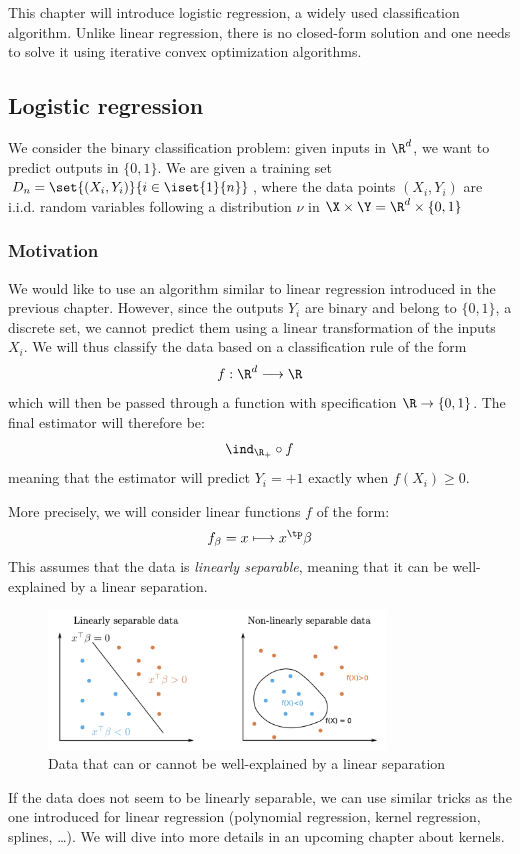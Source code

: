 \documentclass[toc, titlepaged]{../cs-classes/cs-classes}
\begin{document}
This chapter will introduce logistic regression, a widely used classification algorithm. Unlike linear regression, there is no closed-form solution and one needs to solve it using iterative convex optimization algorithms.

\subsection{Logistic regression}
We consider the binary classification problem: given inputs in $\R^d$, we want to predict outputs in $\{0, 1\}$. We are given a training set $D_n=\set{(X_i, Y_i)}{i\in\iset{1}{n}}$, where the data points $(X_i, Y_i)$ are i.i.d. random variables following a distribution $\nu$ in $\X\times\Y=\R^d\times\{0, 1\}$

\subsubsection{Motivation}
We would like to use an algorithm similar to linear regression introduced in the previous chapter. However, since the outputs $Y_i$ are binary and belong to $\{0, 1\}$, a discrete set, we cannot predict them using a linear transformation of the inputs $X_i$. We will thus classify the data based on a classification rule of the form
\begin{equation*}
    f : \R^d \longrightarrow \R
\end{equation*}
which will then be passed through a function with specification $\R\to\{0, 1\}$. The final estimator will therefore be:
\begin{equation*}
    \ind_{\R_+}\circ f
\end{equation*}
meaning that the estimator will predict $Y_i=+1$ exactly when $f(X_i)\geq0$.

More precisely, we will consider linear functions $f$ of the form:
\begin{equation*}
    f_\beta = x \longmapsto x^\tp\beta
\end{equation*}
This assumes that the data is \emph{linearly separable}, meaning that it can be well-explained by a linear separation.
\begin{figure}[H]
    \centering
    \includegraphics[width=0.8\textwidth]{images/linearly-separable.png}
    \caption{Data that can or cannot be well-explained by a linear separation}
\end{figure}
If the data does not seem to be linearly separable, we can use similar tricks as the one introduced for linear regression (polynomial regression, kernel regression, splines, \dots). We will dive into more details in an upcoming chapter about kernels.
\end{document}
